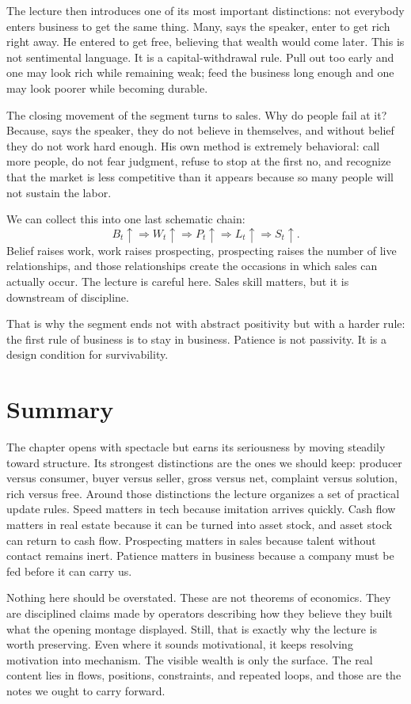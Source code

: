 The lecture then introduces one of its most important distinctions: not everybody enters business to get the same thing. Many, says the speaker, enter to get rich right away. He entered to get free, believing that wealth would come later. This is not sentimental language. It is a capital-withdrawal rule. Pull out too early and one may look rich while remaining weak; feed the business long enough and one may look poorer while becoming durable.

The closing movement of the segment turns to sales. Why do people fail at it? Because, says the speaker, they do not believe in themselves, and without belief they do not work hard enough. His own method is extremely behavioral: call more people, do not fear judgment, refuse to stop at the first no, and recognize that the market is less competitive than it appears because so many people will not sustain the labor.

We can collect this into one last schematic chain:
\begin{equation}
B_t \uparrow \Rightarrow W_t \uparrow \Rightarrow P_t \uparrow \Rightarrow L_t \uparrow \Rightarrow S_t \uparrow.
\end{equation}
Belief raises work, work raises prospecting, prospecting raises the number of live relationships, and those relationships create the occasions in which sales can actually occur. The lecture is careful here. Sales skill matters, but it is downstream of discipline.

That is why the segment ends not with abstract positivity but with a harder rule: the first rule of business is to stay in business. Patience is not passivity. It is a design condition for survivability.

\section{Summary}

The chapter opens with spectacle but earns its seriousness by moving steadily toward structure. Its strongest distinctions are the ones we should keep: producer versus consumer, buyer versus seller, gross versus net, complaint versus solution, rich versus free. Around those distinctions the lecture organizes a set of practical update rules. Speed matters in tech because imitation arrives quickly. Cash flow matters in real estate because it can be turned into asset stock, and asset stock can return to cash flow. Prospecting matters in sales because talent without contact remains inert. Patience matters in business because a company must be fed before it can carry us.

Nothing here should be overstated. These are not theorems of economics. They are disciplined claims made by operators describing how they believe they built what the opening montage displayed. Still, that is exactly why the lecture is worth preserving. Even where it sounds motivational, it keeps resolving motivation into mechanism. The visible wealth is only the surface. The real content lies in flows, positions, constraints, and repeated loops, and those are the notes we ought to carry forward.